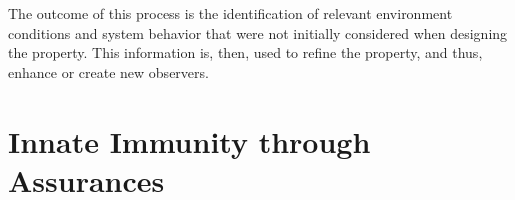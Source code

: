 The outcome of this process is the identification of relevant environment conditions and system behavior that were not initially considered when designing the property. This information is, then, used to refine the property, and thus, enhance or create new observers.


\section{Innate Immunity through Assurances}








